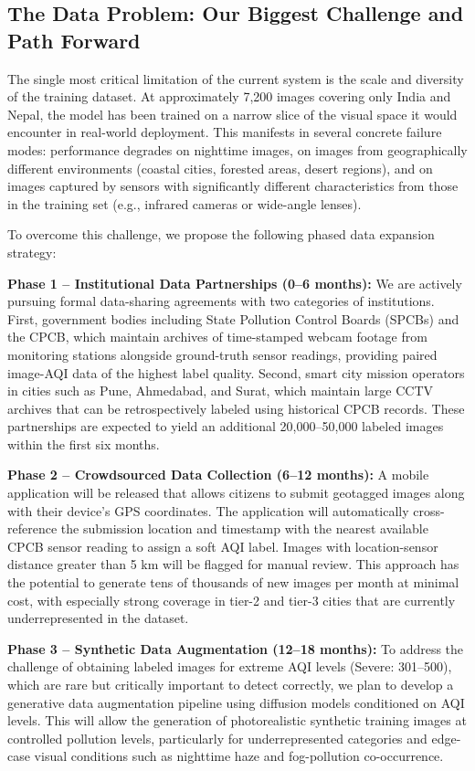 \documentclass[conference]{IEEEtran}
\begin{document}
\subsection{The Data Problem: Our Biggest Challenge and Path Forward}

The single most critical limitation of the current system is the scale and
diversity of the training dataset. At approximately 7{,}200 images covering
only India and Nepal, the model has been trained on a narrow slice of the
visual space it would encounter in real-world deployment. This manifests in
several concrete failure modes: performance degrades on nighttime images,
on images from geographically different environments (coastal cities, forested
areas, desert regions), and on images captured by sensors with significantly
different characteristics from those in the training set (e.g., infrared
cameras or wide-angle lenses).

To overcome this challenge, we propose the following phased data expansion
strategy:

\textbf{Phase 1 -- Institutional Data Partnerships (0--6 months):} We are
actively pursuing formal data-sharing agreements with two categories of
institutions. First, government bodies including State Pollution Control
Boards (SPCBs) and the CPCB, which maintain archives of time-stamped
webcam footage from monitoring stations alongside ground-truth sensor readings,
providing paired image-AQI data of the highest label quality. Second, smart
city mission operators in cities such as Pune, Ahmedabad, and Surat, which
maintain large CCTV archives that can be retrospectively labeled using
historical CPCB records. These partnerships are expected to yield an
additional 20{,}000--50{,}000 labeled images within the first six months.

\textbf{Phase 2 -- Crowdsourced Data Collection (6--12 months):} A mobile
application will be released that allows citizens to submit geotagged
images along with their device's GPS coordinates. The application will
automatically cross-reference the submission location and timestamp with the
nearest available CPCB sensor reading to assign a soft AQI label. Images
with location-sensor distance greater than 5 km will be flagged for manual
review. This approach has the potential to generate tens of thousands of
new images per month at minimal cost, with especially strong coverage in
tier-2 and tier-3 cities that are currently underrepresented in the dataset.

\textbf{Phase 3 -- Synthetic Data Augmentation (12--18 months):} To address
the challenge of obtaining labeled images for extreme AQI levels (Severe:
301--500), which are rare but critically important to detect correctly, we
plan to develop a generative data augmentation pipeline using diffusion
models conditioned on AQI levels. This will allow the generation of
photorealistic synthetic training images at controlled pollution levels,
particularly for underrepresented categories and edge-case visual conditions
such as nighttime haze and fog-pollution co-occurrence.
\end{document}
